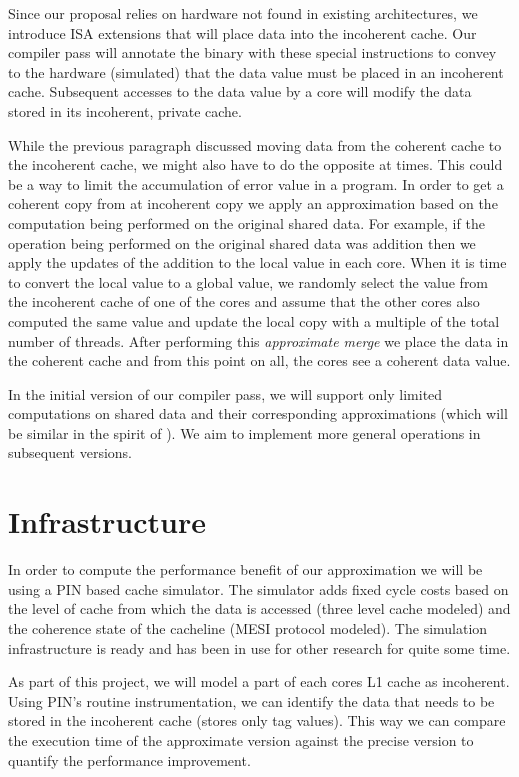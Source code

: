 \documentclass[12pt,conference]{IEEEtran}
\begin{document}
Since our proposal relies on hardware not found in existing 
architectures, we introduce ISA extensions that will place data into 
the incoherent cache. Our compiler pass will annotate the binary
with these special instructions to convey to the hardware (simulated) 
that the data value must be placed in an incoherent cache. Subsequent
accesses to the data value by a core will modify the data stored in its
incoherent, private cache. 

While the previous paragraph discussed moving data from the coherent cache to 
the incoherent cache, we might also have to do the opposite at times. 
This could be a way to limit the accumulation of error value in a program. 
In order to get a coherent copy from at incoherent copy we
apply an approximation based on the computation being performed
on the original shared data. For example, if the operation being 
performed on the original shared data was addition then we 
apply the updates of the addition to the local value in each core. 
When it is time to convert the local value to a global value, 
we randomly select the value from the incoherent cache of one
of the cores and assume that the other cores also computed 
the same value and update the local copy with a multiple of the total number of threads. After performing this \emph{approximate merge}
we place the data in the coherent cache and from this 
point on all, the cores see a coherent data value.

In the initial version of our compiler pass, we will 
support only limited computations on shared data and their
corresponding approximations (which will be similar in the 
spirit of \cite{paraprox}). We aim to implement more
general operations in subsequent versions.

\section{Infrastructure}

In order to compute the performance benefit of our approximation
we will be using a PIN based cache simulator. The simulator adds 
fixed cycle costs based on the level of cache from which the
data is accessed (three level cache modeled) and the coherence
state of the cacheline (MESI protocol modeled). The simulation
infrastructure is ready and has been in use for other research
for quite some time.

As part of this project, we will model a part of each cores
L1 cache as incoherent. Using PIN's routine instrumentation,
we can identify the data that needs to be stored in the incoherent
cache (stores only tag values). This way we can compare the 
execution time of the approximate version against the precise
version to quantify the performance improvement.
\end{document}
